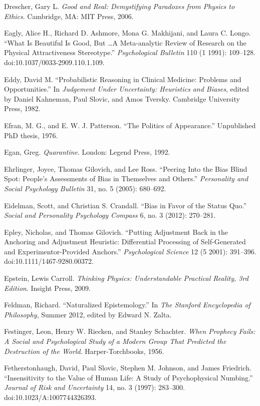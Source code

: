 \documentclass[letterpaper]{book}
\begin{document}
{
 Drescher, Gary L. \textit{Good and Real: Demystifying Paradoxes
from Physics to Ethics}. Cambridge, MA: MIT Press, 2006.}

{
 Eagly, Alice H., Richard D. Ashmore, Mona G. Makhijani, and Laura
C. Longo. ``What Is Beautiful Is Good, But \ldots A
Meta-analytic Review of Research on the Physical Attractiveness
Stereotype.'' \textit{Psychological Bulletin} 110 (1
1991): 109--128. doi:10.1037/0033-2909.110.1.109.}

{
 Eddy, David M. ``Probabilistic Reasoning in
Clinical Medicine: Problems and Opportunities.'' In
\textit{Judgement Under Uncertainty: Heuristics and Biases}, edited by
Daniel Kahneman, Paul Slovic, and Amos Tversky. Cambridge University
Press, 1982.}

{
 Efran, M. G., and E. W. J. Patterson. ``The
Politics of Appearance.'' Unpublished PhD thesis,
1976.}

{
 Egan, Greg. \textit{Quarantine}. London: Legend Press, 1992.}

{
 Ehrlinger, Joyce, Thomas Gilovich, and Lee Ross.
``Peering Into the Bias Blind Spot:
People's Assessments of Bias in Themselves and
Others.'' \textit{Personality and Social Psychology
Bulletin} 31, no. 5 (2005): 680--692.}

{
 Eidelman, Scott, and Christian S. Crandall.
``Bias in Favor of the Status Quo.''
\textit{Social and Personality Psychology Compass} 6, no. 3 (2012):
270--281.}

{
 Epley, Nicholas, and Thomas Gilovich. ``Putting
Adjustment Back in the Anchoring and Adjustment Heuristic: Differential
Processing of Self-Generated and Experimentor-Provided
Anchors.'' \textit{Psychological Science} 12 (5
2001): 391--396. doi:10.1111/1467-9280.00372.}

{
 Epstein, Lewis Carroll. \textit{Thinking Physics: Understandable
Practical Reality, 3rd Edition}. Insight Press, 2009.}

{
 Feldman, Richard. ``Naturalized
Epistemology.'' In \textit{The Stanford Encyclopedia
of Philosophy}, Summer 2012, edited by Edward N. Zalta.}

{
 Festinger, Leon, Henry W. Riecken, and Stanley Schachter.
\textit{When Prophecy Fails: A Social and Psychological Study of a
Modern Group That Predicted the Destruction of the World}.
Harper-Torchbooks, 1956.}

{
 Fetherstonhaugh, David, Paul Slovic, Stephen M. Johnson, and James
Friedrich. ``Insensitivity to the Value of Human Life:
A Study of Psychophysical Numbing.'' \textit{Journal
of Risk and Uncertainty} 14, no. 3 (1997): 283--300.
doi:10.1023/A:1007744326393.}
\end{document}
